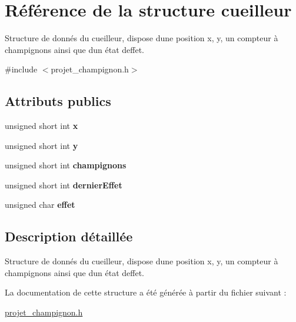 \hypertarget{structcueilleur}{}\section{Référence de la structure cueilleur}
\label{structcueilleur}


Structure de donnés du cueilleur, dispose d\textquotesingle{}une position x, y, un compteur à champignons ainsi que d\textquotesingle{}un état d\textquotesingle{}effet.  




{\ttfamily \#include $<$projet\+\_\+champignon.\+h$>$}

\subsection*{Attributs publics}
\begin{DoxyCompactItemize}
\item 
\hypertarget{structcueilleur_a017a8b1c47e808d6f3f9b6d2a92f35c9}{}\label{structcueilleur_a017a8b1c47e808d6f3f9b6d2a92f35c9} 
unsigned short int {\bfseries x}
\item 
\hypertarget{structcueilleur_a202be7a821f821dcd06a0be399d61621}{}\label{structcueilleur_a202be7a821f821dcd06a0be399d61621} 
unsigned short int {\bfseries y}
\item 
\hypertarget{structcueilleur_a89f83749304fc3f15ae688ecc1e9763e}{}\label{structcueilleur_a89f83749304fc3f15ae688ecc1e9763e} 
unsigned short int {\bfseries champignons}
\item 
\hypertarget{structcueilleur_ad5310a1c12482eed19273b43720037bd}{}\label{structcueilleur_ad5310a1c12482eed19273b43720037bd} 
unsigned short int {\bfseries dernier\+Effet}
\item 
\hypertarget{structcueilleur_a01dc3c7d4d0ba7bf1fae36090db94e5e}{}\label{structcueilleur_a01dc3c7d4d0ba7bf1fae36090db94e5e} 
unsigned char {\bfseries effet}
\end{DoxyCompactItemize}


\subsection{Description détaillée}
Structure de donnés du cueilleur, dispose d\textquotesingle{}une position x, y, un compteur à champignons ainsi que d\textquotesingle{}un état d\textquotesingle{}effet. 

La documentation de cette structure a été générée à partir du fichier suivant \+:\begin{DoxyCompactItemize}
\item 
\hyperlink{projet__champignon_8h}{projet\+\_\+champignon.\+h}\end{DoxyCompactItemize}
